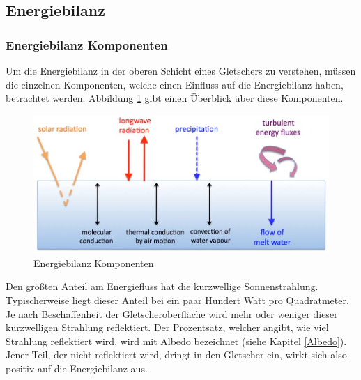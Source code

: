 \documentclass[12pt,a4paper]{article}
\begin{document}
\subsection{Energiebilanz}
\subsubsection{Energiebilanz Komponenten}\label{Energiebilanz Komponenten}
Um die Energiebilanz in der oberen Schicht eines Gletschers zu verstehen, müssen die einzelnen Komponenten, welche einen Einfluss auf die Energiebilanz haben, betrachtet werden. Abbildung \ref{fig:Energiebilanz Komponenten} gibt einen Überblick über diese Komponenten.

\begin{figure}[H]
\centering
\includegraphics[width=1\textwidth]{pictures/energy_balance_components.png}
\caption[Energiebilanz Komponenten]{Energiebilanz Komponenten \parencite{Themicroclimateofvalleyglaciers}}
\label{fig:Energiebilanz Komponenten}
\end{figure}

Den größten Anteil am Energiefluss hat die kurzwellige Sonnenstrahlung. Typischerweise liegt dieser Anteil bei ein paar Hundert Watt pro Quadratmeter. Je nach Beschaffenheit der Gletscheroberfläche wird mehr oder weniger dieser kurzwelligen Strahlung reflektiert. Der Prozentsatz, welcher angibt, wie viel Strahlung reflektiert wird, wird mit Albedo bezeichnet (siehe Kapitel \ref{Albedo}). Jener Teil, der nicht reflektiert wird, dringt in den Gletscher ein, wirkt sich also positiv auf die Energiebilanz aus.\\
\end{document}
